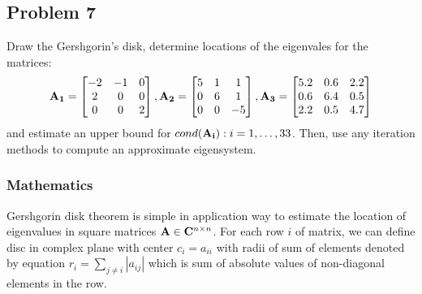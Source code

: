 \subsection{Problem 7}%
\label{sec:problem_7}

Draw the Gershgorin's disk, determine locations of the eigenvales for the matrices:
\begin{equation*}
    \mathbf{A_1} = 
    \begin{bmatrix}
        -2 & -1 &  0\\
         2 &  0 &  0\\
         0 &  0 &  2 
    \end{bmatrix},
    \mathbf{A_2} = 
    \begin{bmatrix}
        5 & 1 &  1\\
        0 & 6 &  1\\
        0 & 0 &  -5 
    \end{bmatrix},
    \mathbf{A_3} = 
    \begin{bmatrix}
        5.2 &  0.6 &  2.2\\
        0.6 &  6.4 &  0.5\\
        2.2 &  0.5 &  4.7 
    \end{bmatrix}
\end{equation*}
and estimate an upper bound for $cond(\mathbf{A_i}) : i = 1, \ldots, 3 3$.
Then, use any iteration methods to compute an approximate eigensystem.

\subsubsection*{Mathematics}
Gershgorin disk theorem is simple in application way to estimate the location of eigenvalues in square matrices $\mathbf{A} \in \mathbf{C}^{n\times{}n}$.
For each row $i$ of matrix, we can define disc in complex plane with center $c_i = a_{ii}$ with radii of sum of elements denoted by equation
$r_i = \sum_{j \neq i} |a_{ij}|$ which is sum of absolute values of non-diagonal elements in the row.

